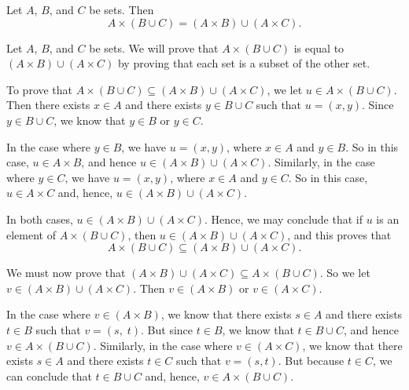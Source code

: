 \begin{theorem} \label{T:propsofcartprodx}
Let  $A$, $B$, and  $C$  be sets.  Then
\[
A \times \left( {B \cup C} \right) = \left( {A \times B} \right) \cup \left( {A \times C} \right).
\]
\end{theorem}
%
\begin{myproof}
Let  $A$, $B$, and  $C$  be sets.  We will prove that $A \times \left( {B \cup C} \right)$ is equal to $\left( {A \times B} \right) \cup \left( {A \times C} \right)$ by proving that each set is a subset of the other set.

To prove that  $A \times \left( {B \cup C} \right) \subseteq \left( {A \times B} \right) \cup \left( {A \times C} \right)$, we let  $u \in A \times \left( {B \cup C} \right)$. Then there exists $x \in A$ and there exists  $y \in B \cup C$ such that  $u = \left( {x,y} \right)$.  Since  $y \in B \cup C$, we know that  $y \in B$  or  $y \in C$.

In the case where  $y \in B$, we have  $u = \left( {x,y} \right)$, where  $x \in A$  and  $y \in B$.  So in this case,  $u \in A \times B$, and hence  $u \in \left( {A \times B} \right) \cup \left( {A \times C} \right)$.  Similarly, in the case where  $y \in C$, we have  $u = \left( {x,y} \right)$, where  $x \in A$  and  $y \in C$.  So in this case,  $u \in A \times C$ and, hence, $u \in \left( {A \times B} \right) \cup \left( {A \times C} \right)$.  

In both cases, $u \in \left( {A \times B} \right) \cup \left( {A \times C} \right)$.  Hence, we may conclude that if  $u$ is an element of  $A \times \left( {B \cup C} \right)$, then  $u \in \left( {A \times B} \right) \cup \left( {A \times C} \right)$, and this proves that
\begin{equation} \label{eq:4m}
A \times \left( {B \cup C} \right) \subseteq \left( {A \times B} \right) \cup \left( {A \times C} \right)\!.
\end{equation}

We must now prove that  $\left( {A \times B} \right) \cup \left( {A \times C} \right) \subseteq A \times \left( {B \cup C} \right)$. So we let $v \in \left( {A \times B} \right) \cup \left( {A \times C} \right)$.  Then $v \in \left( {A \times B} \right)$  or  $v \in \left( {A \times C} \right)$.

In the case where  $v \in \left( {A \times B} \right)$, we know that there exists  $s \in A$ and there exists  $t \in B$ such that  $v = \left( {s,\;t} \right)$.  But since  $t \in B$, we know that  $t \in B \cup C$, and hence  $v \in A \times \left( {B \cup C} \right)$.  Similarly, in the case where  $v \in \left( {A \times C} \right)$, we know that there exists  $s \in A$ and there exists  $t \in C$ such that  $v = \left( {s,t} \right)$.  But because  $t \in C$, we can conclude that  $t \in B \cup C$ and, hence,  $v \in A \times \left( {B \cup C} \right)$.


\end{myproof}
